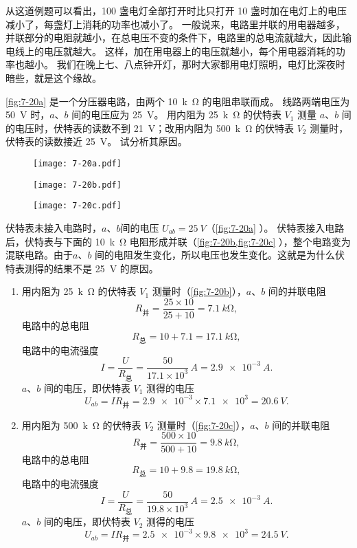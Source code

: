 从这道例题可以看出，100 盏电灯全部打开时比只打开 10 盏时加在电灯上的电压减小了，每盏灯上消耗的功率也减小了。
一般说来，电路里并联的用电器越多，并联部分的电阻就越小，在总电压不变的条件下，电路里的总电流就越大，因此输电线上的电压就越大。
这样，加在用电器上的电压就越小，每个用电器消耗的功率也越小。
我们在晚上七、八点钟开灯，那时大家都用电灯照明，电灯比深夜时暗些，就是这个缘故。

\begin{example}
\cref{fig:7-20a} 是一个分压器电路，由两个 \qty{10}{k\ohm} 的电阻串联而成。
线路两端电压为 \qty{50}{V} 时，$a$、$b$ 间的电压应为 \qty{25}{V}。
用内阻为 \qty{25}{k\ohm} 的伏特表 $V_1$ 测量 $a$、$b$ 间的电压时，伏特表的读数不到 \qty{21}{V}；改用内阻为 \qty{500}{k\ohm} 的伏特表 $V_2$ 测量时，伏特表的读数接近 \qty{25}{V}。
试分析其原因。
\end{example}
\begin{figure}
  \begin{minipage}{0.32\linewidth}\centering
    \texttt{[image: 7-20a.pdf]}
    \subcaption{}\label{fig:7-20a}
  \end{minipage}
  \begin{minipage}{0.32\linewidth}\centering
    \texttt{[image: 7-20b.pdf]}
    \subcaption{}\label{fig:7-20b}
  \end{minipage}
  \begin{minipage}{0.32\linewidth}\centering
    \texttt{[image: 7-20c.pdf]}
    \subcaption{}\label{fig:7-20c}
  \end{minipage}
  \caption{}\label{fig:7-20}
\end{figure}	

\begin{solution}
伏特表未接入电路时，$a$、$b $间的电压 $U_{ab}=\qty{25}{V}$（\cref{fig:7-20a} ）。
伏特表接入电路后，伏特表与下面的 \qty{10}{k\ohm} 电阻形成并联（\cref{fig:7-20b,fig:7-20c} ），整个电路变为混联电路。由于$a$、$b$ 间的电阻发生变化，所以电压也发生变化。这就是为什么伏特表测得的结果不是 \qty{25}{V} 的原因。

\begin{enumerate}
  \item 用内阻为 \qty{25}{k\ohm} 的伏特表 $V_1$ 测量时（\cref{fig:7-20b}），$a$、$b$ 间的并联电阻
\[R_{\text{并}}=\frac{25\times 10}{25+10}=\qty{7.1}{k\ohm},\]
电路中的总电阻
\[R_{\text{总}}=10+7.1=\qty{17.1}{k\ohm},\]
电路中的电流强度
\[I=\frac{U}{R_{\text{总}}}=\frac{50}{17.1\times 10^3} \,\unit{A}=\qty{2.9e-3}{A}.\]
$a$、$b$ 间的电压，即伏特表 $V_1$ 测得的电压
\[U_{ab}=IR_{\text{并}}=\num{2.9e-3}\times\num{7.1e3}=\qty{20.6}{V}.\]

  \item 用内阻为 \qty{500}{k\ohm} 的伏特表 $V_2$ 测量时（\cref{fig:7-20c}），$a$、$b$ 间的并联电阻
\[R_{\text{并}}=\frac{500\times 10}{500+10}=\qty{9.8}{k\ohm},\]
电路中的总电阻
\[R_{\text{总}}=10+9.8=\qty{19.8}{k\ohm},\]
电路中的电流强度
\[I=\frac{U}{R_{\text{总}}}=\frac{50}{19.8\times 10^3}\,\unit{A}=\qty{2.5e-3}{A}.\]
$a$、$b$ 间的电压，即伏特表 $V_2$ 测得的电压
\[U_{ab}=IR_{\text{并}}=\num{2.5e-3}\times \num{9.8e3}=\qty{24.5}{V}.\]
\end{enumerate}
\end{solution}

